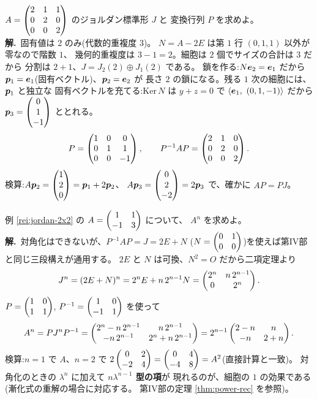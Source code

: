 \begin{rei}[例題・標準($3$ 次・細胞 $2$ 個)]\label{rei:jordan-3x3two}
$A = \begin{pmatrix}2 & 1 & 1 \\ 0 & 2 & 0 \\ 0 & 0 & 2\end{pmatrix}$ のジョルダン標準形 $J$ と
変換行列 $P$ を求めよ。\\
\textbf{解.}\ 固有値は $2$ のみ(代数的重複度 $3$)。
$N = A - 2E$ は第 $1$ 行 $(0, 1, 1)$ 以外が零なので階数 $1$、
幾何的重複度は $3 - 1 = 2$。細胞は $2$ 個でサイズの合計は $3$ だから
分割は $2 + 1$、$J = J_2(2) \oplus J_1(2)$ である。
鎖を作る:$N\bm{e}_2 = \bm{e}_1$ だから
$\bm{p}_1 = \bm{e}_1$(固有ベクトル)、$\bm{p}_2 = \bm{e}_2$ が
長さ $2$ の鎖になる。残る $1$ 次の細胞には、$\bm{p}_1$ と独立な
固有ベクトルを充てる:$\mathrm{Ker}\,N$ は $y + z = 0$ で
$\langle \bm{e}_1,\ (0, 1, -1) \rangle$ だから
$\bm{p}_3 = \begin{pmatrix}0 \\ 1 \\ -1\end{pmatrix}$ ととれる。
\[
P = \begin{pmatrix}1 & 0 & 0 \\ 0 & 1 & 1 \\ 0 & 0 & -1\end{pmatrix}, \qquad
P^{-1}AP = \begin{pmatrix}2 & 1 & 0 \\ 0 & 2 & 0 \\ 0 & 0 & 2\end{pmatrix}.
\]
検算:$A\bm{p}_2 = \begin{pmatrix}1 \\ 2 \\ 0\end{pmatrix} = \bm{p}_1 + 2\bm{p}_2$、
$A\bm{p}_3 = \begin{pmatrix}0 \\ 2 \\ -2\end{pmatrix} = 2\bm{p}_3$ で、確かに $AP = PJ$。
\end{rei}

\begin{rei}[例題・標準(ジョルダン標準形でべき乗を計算する)]\label{rei:jordan-power}
例 \ref{rei:jordan-2x2} の $A = \begin{pmatrix}1 & 1 \\ -1 & 3\end{pmatrix}$ について、
$A^n$ を求めよ。\\
\textbf{解.}\ 対角化はできないが、$P^{-1}AP = J = 2E + N$
($N = \begin{pmatrix}0 & 1 \\ 0 & 0\end{pmatrix}$)を使えば第IV部と同じ三段構えが通用する。
$2E$ と $N$ は可換、$N^2 = O$ だから二項定理より
\[
J^n = (2E + N)^n = 2^n E + n\,2^{n-1} N = \begin{pmatrix}2^n & n\,2^{n-1} \\ 0 & 2^n\end{pmatrix}.
\]
$P = \begin{pmatrix}1 & 0 \\ 1 & 1\end{pmatrix}$, $P^{-1} = \begin{pmatrix}1 & 0 \\ -1 & 1\end{pmatrix}$ を使って
\[
A^n = P J^n P^{-1}
= \begin{pmatrix}2^n - n\,2^{n-1} & n\,2^{n-1} \\ -n\,2^{n-1} & 2^n + n\,2^{n-1}\end{pmatrix}
= 2^{n-1}\begin{pmatrix}2 - n & n \\ -n & 2 + n\end{pmatrix}.
\]
検算:$n = 1$ で $A$、$n = 2$ で
$2\begin{pmatrix}0 & 2 \\ -2 & 4\end{pmatrix} = \begin{pmatrix}0 & 4 \\ -4 & 8\end{pmatrix} = A^2$(直接計算と一致)。
対角化のときの $\lambda^n$ に加えて \textbf{$n\lambda^{n-1}$ 型の項}が
現れるのが、細胞の $1$ の効果である(漸化式の重解の場合に対応する。
第IV部の定理 \ref{thm:power-rec} を参照)。
\end{rei}

